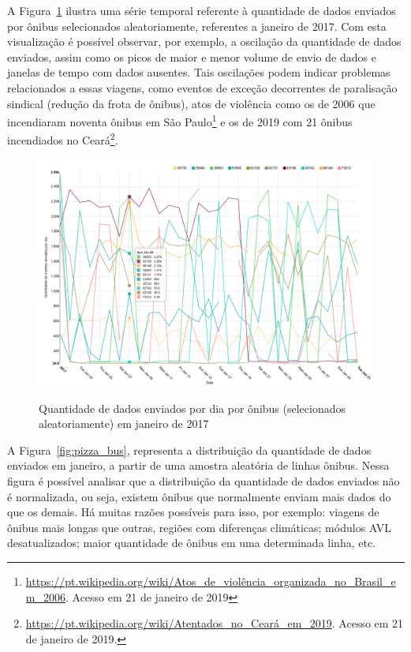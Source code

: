 \documentclass[
	12pt,				%
	oneside,			%
	a4paper,			%
	english,			%
	brazil				%
	]{abntex2ppgsi}
\begin{document}
{{A Figura~\ref{fig:analysis_by_bus_lines} ilustra uma série temporal referente à quantidade de dados enviados por ônibus selecionados aleatoriamente, referentes a janeiro de 2017. Com esta visualização é possível observar, por exemplo, a oscilação da quantidade de dados enviados, assim como os picos de maior e menor volume de envio de dados e janelas de tempo com dados ausentes. Tais oscilações podem indicar problemas relacionados a essas viagens, como eventos de exceção decorrentes de paralisação sindical (redução da frota de ônibus), atos de violência como os de 2006 que incendiaram noventa ônibus em São Paulo\footnote{\url{https://pt.wikipedia.org/wiki/Atos\_de_violência\_organizada\_no\_Brasil\_em\_2006}. Acesso em 21 de janeiro de 2019} e os de 2019 com 21 ônibus incendiados no Ceará\footnote{\url{https://pt.wikipedia.org/wiki/Atentados_no_Ceará_em_2019}. Acesso em 21 de janeiro de 2019.}.

\begin{figure}[!htb]%
	\centering
 	  \caption{Quantidade de dados enviados por dia  por ônibus (selecionados aleatoriamente) em janeiro de 2017}
		\includegraphics[width=1\linewidth]{images/analysis_by_bus_lines_pt.png}
	\label{fig:analysis_by_bus_lines}
\end{figure}

A Figura~\ref{fig:pizza_bus}, representa a distribuição da quantidade de dados enviados em janeiro, a partir de uma amostra aleatória de linhas ônibus. Nessa figura é possível analisar que a distribuição da quantidade de dados enviados não é normalizada, ou seja, existem ônibus que normalmente enviam mais dados do que os demais. Há muitas razões possíveis para isso, por exemplo: viagens de ônibus mais longas que outras, regiões com diferenças climáticas; módulos AVL desatualizados; maior quantidade de ônibus em uma determinada linha, etc.

}}
\end{document}
